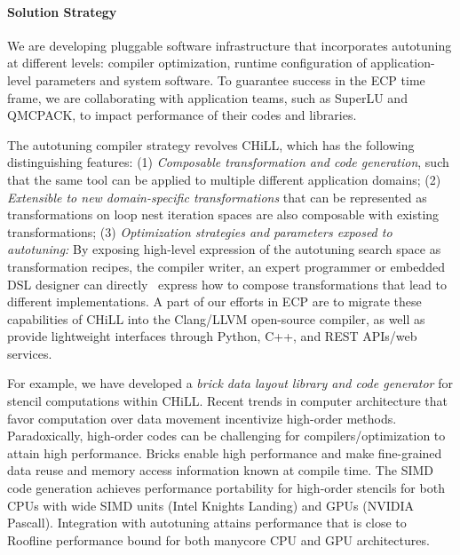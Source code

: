 \paragraph{Solution Strategy}
We are developing pluggable software infrastructure that incorporates
autotuning at different levels: compiler optimization, runtime configuration of application-level parameters and system software.
To guarantee success in the ECP time frame, we are collaborating with
application teams, such as SuperLU and QMCPACK, to impact performance of their
codes and libraries.

The autotuning compiler strategy revolves CHiLL, which has the following distinguishing features:
(1) \textit{Composable transformation and code generation}, such
that the same tool can be applied
to multiple different application domains;
(2) \textit{Extensible to new domain-specific transformations} that can be represented as transformations on loop nest iteration spaces are also
composable with existing transformations;
(3) \textit{Optimization strategies and parameters exposed to autotuning:}
By exposing high-level expression
of the autotuning search space as transformation recipes, the compiler writer, an expert programmer or embedded DSL designer can directly \
express how to compose
 transformations that lead to different implementations.
A part of our efforts in ECP are to migrate these capabilities of CHiLL
into the Clang/LLVM open-source compiler, as well as provide lightweight
interfaces through Python, C++, and REST APIs/web services.

For example, we have developed a \textit{brick data layout library and code generator} for
stencil computations within CHiLL.
Recent trends in computer architecture that favor computation over data movement incentivize high-order methods.  Paradoxically, high-order codes can be challenging for compilers/optimization to attain high performance.  Bricks enable high performance and make fine-grained data reuse and memory access information known at compile time.  The SIMD code generation achieves performance portability
for high-order stencils for both CPUs with wide SIMD units (Intel Knights
Landing) and GPUs (NVIDIA Pascall).  Integration with autotuning attains
performance that is close to Roofline performance bound for both manycore CPU
and GPU architectures.

